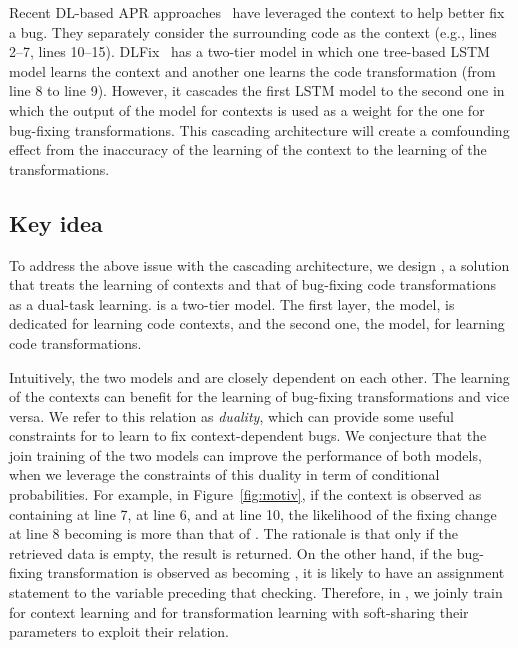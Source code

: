 Recent DL-based APR approaches~\cite{icse20,cure-icse21} have
leveraged the context to help better fix a bug. They separately
consider the surrounding code as the context (e.g., lines 2--7, lines
10--15). DLFix~\cite{icse20} has a two-tier model in which one
tree-based LSTM model learns the context and another one learns the
code transformation (from line 8 to line 9). However, it cascades the
first LSTM model to the second one in which the output of the model
for contexts is used as a weight for the one for bug-fixing
transformations. This cascading architecture will create a comfounding
effect from the inaccuracy of the learning of the context to the
learning of the transformations.

\subsection{Key idea}

To address the above issue with the cascading architecture, we design
{\tool}, a solution that treats the learning of contexts and that of
bug-fixing code transformations as a dual-task learning. {\tool} is a
two-tier model. The first layer, the  model, is dedicated
for learning code contexts, and the second one, the  model,
for learning code transformations.



Intuitively, the two models  and  are closely
dependent on each other. The learning of the contexts can benefit for
the learning of bug-fixing transformations and vice versa. We refer to
this relation as {\em duality}, which can provide some useful
constraints for {\tool} to learn to fix context-dependent bugs. We
conjecture that the join training of the two models can improve the
performance of both models, when we leverage the constraints of this
duality in term of conditional probabilities. For example, in
Figure~\ref{fig:motiv}, if the context is observed as containing
 at line 7,  at line 6, and
 at line 10, the likelihood of the fixing change
at line 8 becoming  is more than that of
. The rationale is that only if the retrieved
data is empty, the result is returned. On the other hand, if the
bug-fixing transformation is observed as 
becoming , it is likely to have an assignment
statement to the variable  preceding that checking.
Therefore, in {\tool}, we joinly train  for context learning
and  for transformation learning with soft-sharing their
parameters to exploit their relation.
